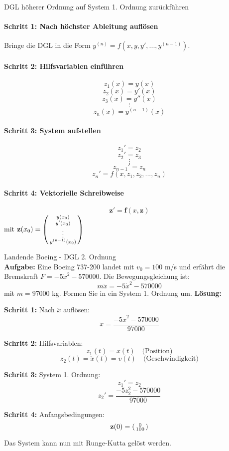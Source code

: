 \begin{KR}{DGL höherer Ordnung auf System 1. Ordnung zurückführen}\\
\paragraph{Schritt 1: Nach höchster Ableitung auflösen}
Bringe die DGL in die Form $y^{(n)} = f(x, y, y', ..., y^{(n-1)})$.

\paragraph{Schritt 2: Hilfsvariablen einführen}
$$z_1(x) = y(x)$$
$$z_2(x) = y'(x)$$
$$z_3(x) = y''(x)$$
$$\vdots$$
$$z_n(x) = y^{(n-1)}(x)$$

\paragraph{Schritt 3: System aufstellen}
$$z_1' = z_2$$
$$z_2' = z_3$$
$$\vdots$$
$$z_{n-1}' = z_n$$
$$z_n' = f(x, z_1, z_2, ..., z_n)$$

\paragraph{Schritt 4: Vektorielle Schreibweise}
$$\mathbf{z}' = \mathbf{f}(x, \mathbf{z})$$ mit $\mathbf{z}(x_0) = \begin{psmallmatrix} y(x_0) \\ y'(x_0) \\ \vdots \\ y^{(n-1)}(x_0) \end{psmallmatrix}$
\end{KR}

\begin{example2}{Landende Boeing - DGL 2. Ordnung}\\
\textbf{Aufgabe:} Eine Boeing 737-200 landet mit $v_0 = 100$ m/s und erfährt die Bremskraft $F = -5\dot{x}^2 - 570000$. Die Bewegungsgleichung ist:
$$m\ddot{x} = -5\dot{x}^2 - 570000$$
mit $m = 97000$ kg. Formen Sie in ein System 1. Ordnung um.
\tcblower
\textbf{Lösung:}

\textbf{Schritt 1:} Nach $\ddot{x}$ auflösen:
$$\ddot{x} = \frac{-5\dot{x}^2 - 570000}{97000}$$

\textbf{Schritt 2:} Hilfsvariablen:
$$z_1(t) = x(t) \quad \text{(Position)}$$
$$z_2(t) = \dot{x}(t) = v(t) \quad \text{(Geschwindigkeit)}$$

\textbf{Schritt 3:} System 1. Ordnung:
$$z_1' = z_2$$
$$z_2' = \frac{-5z_2^2 - 570000}{97000}$$

\textbf{Schritt 4:} Anfangsbedingungen:
$$\mathbf{z}(0) = \begin{psmallmatrix} 0 \\ 100 \end{psmallmatrix}$$

Das System kann nun mit Runge-Kutta gelöst werden.
\end{example2}

